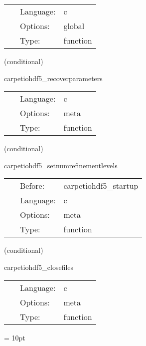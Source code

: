 \hspace{5mm}

 \begin{tabular*}{160mm}{cll} 
~ & Language:  & c \\ 
~ & Options:  & global \\ 
~ & Type:  & function \\ 
\end{tabular*} 


\vspace{5mm}

   (conditional) 

\hspace{5mm} carpetiohdf5\_recoverparameters 

\hspace{5mm}{\it parameter recovery routine } 


\hspace{5mm}

 \begin{tabular*}{160mm}{cll} 
~ & Language:  & c \\ 
~ & Options:  & meta \\ 
~ & Type:  & function \\ 
\end{tabular*} 


\vspace{5mm}

   (conditional) 

\hspace{5mm} carpetiohdf5\_setnumrefinementlevels 

\hspace{5mm}{\it overwrite 'carpetregrid::refinement\_levels' with the number of levels found in the checkpoint file } 


\hspace{5mm}

 \begin{tabular*}{160mm}{cll} 
~ & Before:  & carpetiohdf5\_startup \\ 
~ & Language:  & c \\ 
~ & Options:  & meta \\ 
~ & Type:  & function \\ 
\end{tabular*} 


\vspace{5mm}

   (conditional) 

\hspace{5mm} carpetiohdf5\_closefiles 

\hspace{5mm}{\it close all initial data checkpoint files after recovery } 


\hspace{5mm}

 \begin{tabular*}{160mm}{cll} 
~ & Language:  & c \\ 
~ & Options:  & meta \\ 
~ & Type:  & function \\ 
\end{tabular*} 



\vspace{5mm}\parskip = 10pt 
